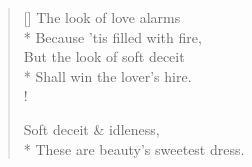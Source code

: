 \documentclass[MAIN]{subfiles}
\begin{document}
\settowidth{\versewidth}{These are beauty's sweetest dress.}
\begin{verse}[\versewidth]
The look of love alarms\\*
Because 'tis filled with fire,\\
But the look of soft deceit\\*
Shall win the lover's hire.\\!

Soft deceit \& idleness,\\*
These are beauty's sweetest dress.
\end{verse}
\end{document}
